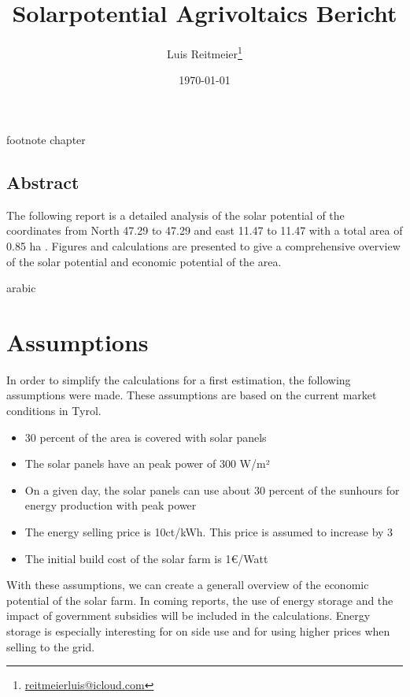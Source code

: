 \documentclass[12pt, a4paper, notitlepage]{scrreprt}
\title
        {\centering Solarpotential Agrivoltaics Bericht}
\author
        {Luis Reitmeier\thanks {\href {mailto: reitmeierluis@icloud.com} {reitmeierluis@icloud.com}}}
\date{\today}
\begin{document}
        \counterwithout
        {footnote}
        {chapter}

        \maketitle

        \vfill
        \section * {Abstract}
        The following report is a detailed analysis of the solar potential of the coordinates from North 47.29 to 47.29 and east 11.47 to 11.47 with a total area of 0.85 ha
        . Figures and calculations are presented to give a comprehensive overview of the solar potential and economic potential of the area.
        
        \pagenumbering
        {arabic}
        \newpage

        \chapter
        {Assumptions}
        
        In order to simplify the calculations for a first estimation, the following assumptions were made. These assumptions are based on 
        the current market conditions in Tyrol.
        
        \begin{itemize}
        \item 30 percent of the area is covered with solar panels
        \item The solar panels have an peak power of 300 W/m²
        \item On a given day, the solar panels can use about 30 percent of the sunhours for energy production with peak power
        \item The energy selling price is 10ct/kWh. This price is assumed to increase by 3%
        \item The initial build cost of the solar farm is 1€/Watt
        
        \end{itemize}
        
        With these assumptions, we can create a generall overview of the economic potential of the solar farm.
        In coming reports, the use of energy storage and the impact of government subsidies will be included in the calculations.
        Energy storage is especially interesting for on side use and for using higher prices when selling to the grid.
\end{document}
